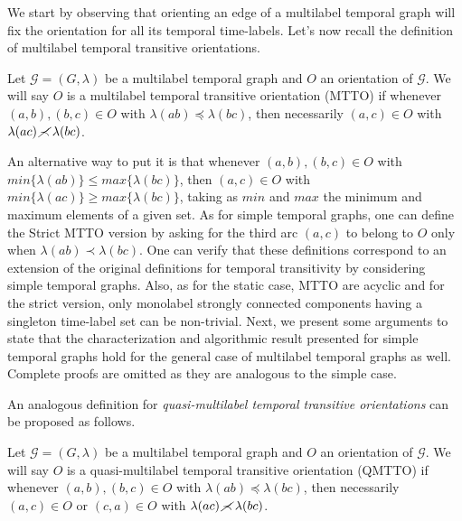 \documentclass[runningheads]{llncs}
\begin{document}
We start by observing that orienting an edge of a multilabel temporal graph will fix the orientation for all its temporal time-labels. Let's now recall the definition of multilabel temporal transitive orientations.

\begin{definition}
Let $\mathcal{G}=(G,\lambda)$ be a multilabel temporal graph and $O$ an orientation of $\mathcal{G}$. We will say $O$ is a multilabel temporal transitive orientation (MTTO) if whenever $(a,b),(b,c) \in O$ with $\lambda(ab) \preceq \lambda(bc)$, then necessarily $(a,c) \in O$ with $\lambda(ac) \hspace{0.5ex} \cancel{\prec} \hspace{0.5ex} \lambda(bc)$.
\end{definition}

An alternative way to put it is that whenever $(a,b),(b,c) \in O$ with $min\{\lambda(ab)\} \leq max\{\lambda(bc)\}$, then $(a,c) \in O$ with $min\{\lambda(ac)\} \geq max\{\lambda(bc)\}$, taking as $min$ and $max$ the minimum and maximum elements of a given set. As for simple temporal graphs, one can define the Strict MTTO version by asking for the third arc $(a,c)$ to belong to $O$ only when $\lambda(ab) \prec \lambda(bc)$. One can verify that these definitions correspond to an extension of the original definitions for temporal transitivity by considering simple temporal graphs. Also, as for the static case, MTTO are acyclic and for the strict version, only monolabel strongly connected components having a singleton time-label set can be non-trivial. Next, we present some arguments to state that the characterization and algorithmic result presented for simple temporal graphs hold for the general case of multilabel temporal graphs as well. Complete proofs are omitted as they are analogous to the simple case.

An analogous definition for \emph{quasi-multilabel temporal transitive orientations} can be proposed as follows. 

\begin{definition}
Let $\mathcal{G}=(G,\lambda)$ be a multilabel temporal graph and $O$ an orientation of $\mathcal{G}$. We will say $O$ is a quasi-multilabel temporal transitive orientation (QMTTO) if whenever $(a,b),(b,c) \in O$ with $\lambda(ab) \preceq \lambda(bc)$, then necessarily $(a,c) \in O$ or $(c,a) \in O$ with $\lambda(ac) \hspace{0.5ex} \cancel{\prec} \hspace{0.5ex} \lambda(bc)$.
\end{definition}
\end{document}

